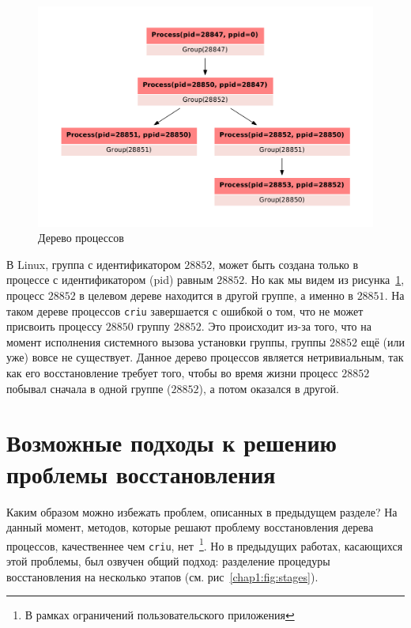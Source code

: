 \begin{figure}[ht!]
	\centering
	\includegraphics[scale=0.5]{fig/groups-pstree.pdf}
\caption{Дерево процессов}
\label{chap1:fig:groupstree}
\end{figure}

В Linux, группа с идентификатором $28852$, может быть создана только в процессе с идентификатором (pid) равным $28852$.
Но как мы видем из рисунка~\ref{chap1:fig:groupstree}, процесс $28852$ в целевом дереве находится в другой группе, а именно в $28851$. На таком дереве процессов \texttt{criu} завершается с ошибкой о том, что не может присвоить процессу $28850$ группу $28852$. Это происходит из-за того, что на момент исполнения системного вызова установки группы, группы $28852$ ещё (или уже) вовсе не существует. Данное дерево процессов является нетривиальным, так как его восстановление требует того, чтобы во время жизни процесс $28852$ побывал сначала в одной группе ($28852$), а потом оказался в другой.

\section{Возможные подходы к решению проблемы восстановления}
\label{chap1:sec:approaches}

Каким образом можно избежать проблем, описанных в предыдущем разделе? На данный момент, методов, которые решают проблему восстановления дерева процессов, качественнее чем \texttt{criu}, нет~\footnote{В рамках ограничений пользовательского приложения}. Но в предыдущих работах, касающихся этой проблемы, был озвучен общий подход: разделение процедуры восстановления на несколько этапов (см. рис~\ref{chap1:fig:stages}).

